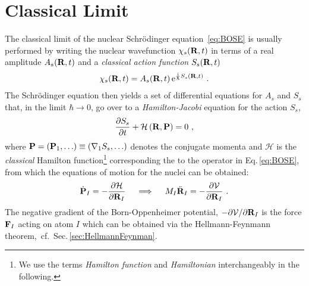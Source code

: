 \section{Classical Limit}
The classical limit of the nuclear Schr\"odinger equation~\eqref{eq:BOSE} is usually performed by writing the nuclear wavefunction $\chi_s ({\bf R}, t)$ in terms of a real amplitude $A_s({\bf R}, t)$ and a \emph{classical action function} $S_s({\bf R}, t)$~\cite{Dirac1981,Landau2013,Marx2009}
\begin{align}
\chi_s({\bf R}, t) = A_s({\bf R}, t) \, {\rm e}^{\frac{\im}{\hbar} S_s({\bf R}, t)}~.
\label{eq:class.1}
\end{align}
The Schr\"odinger equation then yields a set of differential equations for $A_s$ and $S_s$ that, in the limit $\hbar \to 0$, go over to a \emph{Hamilton-Jacobi} equation for the action $S_s$,
\begin{align}
\frac{\partial S_s}{\partial t} + \mathcal H \left({\bf R}, {\bf P}\right)
= 0~,
\label{eq:HamiltonJacobi}
\end{align}
where ${\bf P} = ({\bf P}_1, \ldots) \equiv ({\bf \nabla}_1 S_s, \ldots)$ denotes the conjugate momenta and $\mathcal H$ is the \emph{classical} Hamilton function\footnote{We use the terms \emph{Hamilton function} and \emph{Hamiltonian} interchangeably in the following.} corresponding the to the operator in Eq.\,\eqref{eq:BOSE}, from which the equations of motion for the nuclei can be obtained:
\begin{align}
\dot{{\bf P}}_I 
= -\frac{\partial \mathcal H}{\partial {\bf R}_I}
\quad\implies\quad M_I \ddot{\bf R}_I
= -\frac{\partial \mathcal V}{\partial {\bf R}_I}~.
\end{align}
The negative gradient of the Born-Oppenheimer potential, 
$-\partial \mathcal V / \partial {\bf R}_I$ is the force ${\bf F}_I$ acting on atom $I$ which can be obtained via the Hellmann-Feynmann theorem,~cf.~Sec.\,\ref{sec:HellmannFeynman}.

